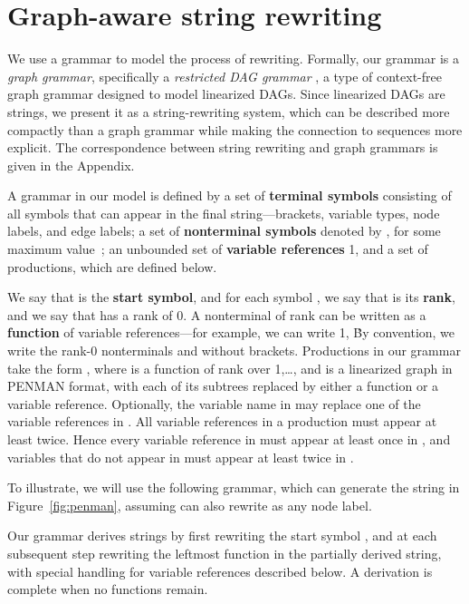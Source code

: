 \documentclass[11pt,a4paper]{article}
\theoremstyle{plain}
\begin{document}
\section{Graph-aware string rewriting}\label{model:rewriting}

We use a grammar to model the process of rewriting. Formally, our grammar is a \emph{graph grammar}, specifically a \emph{restricted DAG grammar} \citep{bjorklund2016between}, a type of context-free graph grammar designed to model linearized DAGs. Since linearized DAGs are strings, we present it as a string-rewriting system, which can be described more compactly than a graph grammar while making the connection to sequences more explicit. The correspondence between string rewriting and graph grammars is given in the Appendix. 

A grammar in our model is defined by a set  of
\textbf{terminal symbols} consisting of all symbols that can appear in
the final string---brackets, variable types, node labels, and edge
labels; a set  of  \textbf{nonterminal symbols} denoted by
, for some maximum value~; an unbounded set
 of \textbf{variable references} 1, \; and a set
of productions, which are defined below.

We say that  is the \textbf{start symbol}, and for each symbol
, we say that  is its \textbf{rank}, and we say that 
has a rank of 0. A nonterminal of rank  can be written as a
\textbf{function} of  variable references---for example, we can
write 1, \. By convention, we write the rank-0 nonterminals
 and  without brackets. Productions in our grammar take the
form , where  is a function of rank
 over 1,\dots, \; and  is a linearized graph in PENMAN
format, with each of its subtrees replaced by either a function or a
variable reference. Optionally, the variable name in  may
replace one of the variable references in . All variable
references in a production must appear at least twice. Hence every
variable reference in  must appear at least once in ,
and variables that do not appear in  must appear at least
twice in .

To illustrate, we will use the following grammar, which can generate the string in Figure~\ref{fig:penman}, assuming  can also rewrite as any node label.\vspace{-9mm}


Our grammar derives strings by first rewriting the start symbol , and at each subsequent step rewriting the leftmost function in the partially derived string, with special handling for variable references described below. A derivation is complete when no functions remain. 
\end{document}

